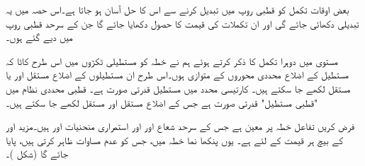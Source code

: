 بعض اوقات تکمل کو قطبی روپ میں تبدیل کرنے سے  اس کا حل آسان ہو جاتا ہے۔اس حصہ میں یہ تبدیلی دکھائی جائے گی اور ان تکملات کی قیمت کا حصول دکھایا جائے گا جن کے سرحد قطبی روپ میں دیے گئے ہوں۔

مستوی  میں دوہرا تکمل کا ذکر کرتے ہوئے  ہم نے خطہ  کو  مستطیلی ٹکڑوں میں اس طرح   کاٹا کہ مستطیل کے اضلاع محددی محوروں کے متوازی ہوں۔اس طرح   ان مستطیلوں کے اضلاع  مستقل  اور یا مستقل  لکھے جا سکتے  ہیں۔ کارتیسی محدد میں مستطیل قدرتی صورت ہے۔ قطبی محددی نظام میں "قطبی مستطیل" قدرتی صورت ہے جس کے اضلاع مستقل  اور مستقل  لکھے جا سکتے ہیں۔

فرض کریں تفاعل   خطہ  پر معین ہے  جس  کے سرحد شعاع  اور  اور استمراری منحنیات  اور   ہیں۔مزید  اور  کے بیچ ہر قیمت کے لئے  ہے۔ یوں   پنکھا نما  خطہ  میں، جس کو عدم مساوات  ظاہر کرتی ہیں، پایا جائے گا (شکل )۔

